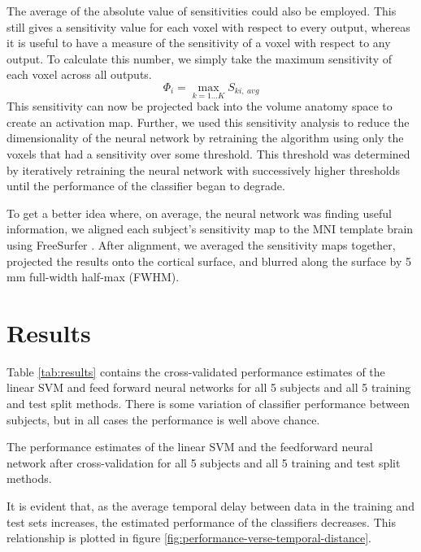 \documentclass[preprint,5p,authoryear]{elsarticle}
\begin{document}
The average of the absolute value of sensitivities could also be employed.
This still gives a sensitivity value for each voxel with respect to every output, whereas it is useful to have a measure of the sensitivity of a voxel with respect to any output.
To calculate this number, we simply take the maximum sensitivity of each voxel across all outputs.
\begin{equation}
\Phi_{i} = \max_{k=1 \dots K}{S_{ki,~avg}}
\end{equation}
This sensitivity can now be projected back into the volume anatomy space to create an activation map.
Further, we used this sensitivity analysis to reduce the dimensionality of the neural network by retraining the algorithm using only the voxels that had a sensitivity over some threshold.
This threshold was determined by iteratively retraining the neural network with successively higher thresholds until the performance of the classifier began to degrade.

To get a better idea where, on average, the neural network was finding useful information, we aligned each subject's sensitivity map to the MNI template brain using FreeSurfer \citep{FreeSurfer}.
After alignment, we averaged the sensitivity maps together, projected the results onto the cortical surface, and blurred along the surface by 5 mm full-width half-max (FWHM).

\section{Results}
Table \ref{tab:results} contains the cross-validated performance estimates of the linear SVM and feed forward neural networks for all 5 subjects and all 5 training and test split methods.
There is some variation of classifier performance between subjects, but in all cases the performance is well above chance. 

\begin{table}
\centering

\caption{The performance estimates of the linear SVM and the feedforward neural network after cross-validation for all 5 subjects and all 5 training and test split methods. }
\label{tab:results}
\end{table}

It is evident that, as the average temporal delay between data in the training and test sets increases, the estimated performance of the classifiers decreases.
This relationship is plotted in figure \ref{fig:performance-verse-temporal-distance}.
\end{document}
